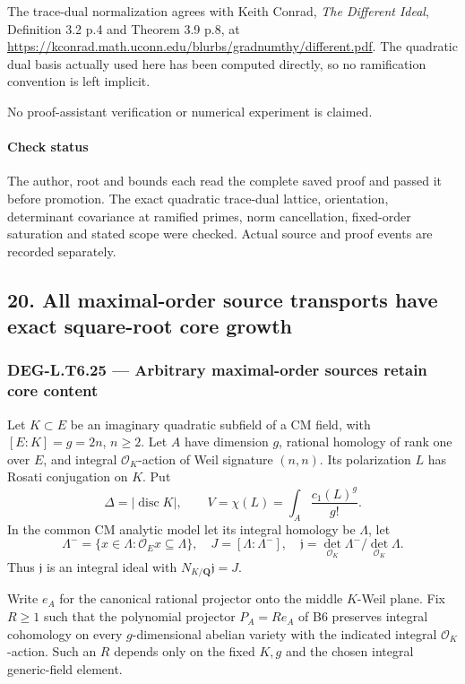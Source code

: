 \documentclass[11pt,a4paper]{article}
\theoremstyle{definition}
\begin{document}
The trace-dual normalization agrees with Keith Conrad, \emph{The Different Ideal}, Definition 3.2 p.4 and Theorem 3.9 p.8, at \url{https://kconrad.math.uconn.edu/blurbs/gradnumthy/different.pdf}. The quadratic dual basis actually used here has been computed directly, so no ramification convention is left implicit.

No proof-assistant verification or numerical experiment is claimed.

\paragraph{Check status}\label{check-status-4}

The author, root and bounds each read the complete saved proof and passed it before promotion. The exact quadratic trace-dual lattice, orientation, determinant covariance at ramified primes, norm cancellation, fixed-order saturation and stated scope were checked. Actual source and proof events are recorded separately.

\subsection{20. All maximal-order source transports have exact square-root core growth}\label{all-maximal-order-source-transports-have-exact-square-root-core-growth}

\subsubsection{DEG-L.T6.25 --- Arbitrary maximal-order sources retain core content}\label{DEG-L.T6.25}

Let \(K\subset E\) be an imaginary quadratic subfield of a CM field, with \([E:K]=g=2n\), \(n\ge2\). Let \(A\) have dimension \(g\), rational homology of rank one over \(E\), and integral \(\mathcal O_K\)-action of Weil signature \((n,n)\). Its polarization \(L\) has Rosati conjugation on \(K\). Put \[
 \Delta=|\operatorname{disc}K|,\qquad
 V=\chi(L)=\int_A\frac{c_1(L)^g}{g!}.
 \tag{T25.1}
\] In the common CM analytic model let its integral homology be \(\Lambda\), let \[
 \Lambda^-=\{x\in\Lambda:\mathcal O_E x\subseteq\Lambda\},\quad
 J=[\Lambda:\Lambda^-],\quad
 \mathfrak j=\det_{\mathcal O_K}\Lambda^-/
                        \det_{\mathcal O_K}\Lambda.
 \tag{T25.2}
\] Thus \(\mathfrak j\) is an integral ideal with \(N_{K/\mathbf Q}\mathfrak j=J\).

Write \(e_A\) for the canonical rational projector onto the middle \(K\)-Weil plane. Fix \(R\ge1\) such that the polynomial projector \(P_A=Re_A\) of B6 preserves integral cohomology on every \(g\)-dimensional abelian variety with the indicated integral \(\mathcal O_K\)-action. Such an \(R\) depends only on the fixed \(K,g\) and the chosen integral generic-field element.
\end{document}
